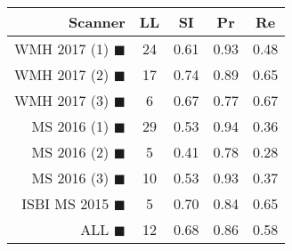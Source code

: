 \begin{tabular}{rcccc}
\toprule
Scanner & LL & SI & Pr & Re \\
\midrule
WMH 2017 (1) {\color[rgb]{ 1.00 0.00 0.00}$\blacksquare$} & 24 & 0.61 & 0.93 & 0.48 \\
WMH 2017 (2) {\color[rgb]{ 1.00 0.50 0.00}$\blacksquare$} & 17 & 0.74 & 0.89 & 0.65 \\
WMH 2017 (3) {\color[rgb]{ 1.00 0.80 0.00}$\blacksquare$} & 6 & 0.67 & 0.77 & 0.67 \\
MS  2016 (1) {\color[rgb]{ 0.20 0.80 0.00}$\blacksquare$} & 29 & 0.53 & 0.94 & 0.36 \\
MS  2016 (2) {\color[rgb]{ 0.00 0.40 1.00}$\blacksquare$} & 5 & 0.41 & 0.78 & 0.28 \\
MS  2016 (3) {\color[rgb]{ 0.60 0.00 1.00}$\blacksquare$} & 10 & 0.53 & 0.93 & 0.37 \\
ISBI MS 2015 {\color[rgb]{ 1.00 0.00 1.00}$\blacksquare$} & 5 & 0.70 & 0.84 & 0.65 \\
\midrule
ALL {\color[rgb]{ 1.00 1.00 1.00}$\blacksquare$} & 12 & 0.68 & 0.86 & 0.58 \\
\bottomrule
\end{tabular}